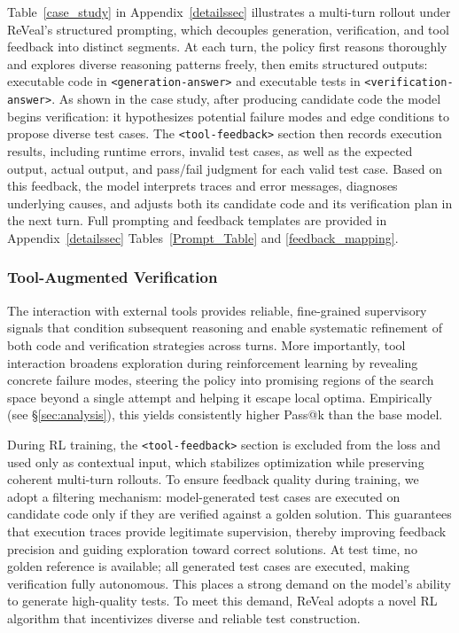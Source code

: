 \documentclass{article} %
\begin{document}
Table~\ref{case_study} in Appendix~\ref{detailssec} illustrates a multi-turn rollout under ReVeal’s structured prompting, which decouples generation, verification, and tool feedback into distinct segments. At each turn, the policy first reasons thoroughly and explores diverse reasoning patterns freely, then emits structured outputs: executable code in \texttt{<generation-answer>} and executable tests in \texttt{<verification-answer>}. As shown in the case study, after producing candidate code the model begins verification: it hypothesizes potential failure modes and edge conditions to propose diverse test cases. The \texttt{<tool-feedback>} section then records execution results, including runtime errors, invalid test cases, as well as the expected output, actual output, and pass/fail judgment for each valid test case. Based on this feedback, the model interprets traces and error messages, diagnoses underlying causes, and adjusts both its candidate code and its verification plan in the next turn.
Full prompting and feedback templates are provided in Appendix~\ref{detailssec} Tables~\ref{Prompt_Table} and \ref{feedback_mapping}.

\subsubsection{Tool-Augmented Verification} The interaction with external tools provides reliable, fine-grained supervisory signals that condition subsequent reasoning and enable systematic refinement of both code and verification strategies across turns.
More importantly, tool interaction broadens exploration during reinforcement learning by revealing concrete failure modes, steering the policy into promising regions of the search space beyond a single attempt and helping it escape local optima. Empirically (see §\ref{sec:analysis}), this yields consistently higher Pass@k than the base model.

During RL training, the \texttt{<tool-feedback>} section is excluded from the loss and used only as contextual input, which stabilizes optimization while preserving coherent multi-turn rollouts.
To ensure feedback quality during training, we adopt a filtering mechanism: model-generated test cases are executed on candidate code only if they are verified against a golden solution. This guarantees that execution traces provide legitimate supervision, thereby improving feedback precision and guiding exploration toward correct solutions. At test time, no golden reference is available; all generated test cases are executed, making verification fully autonomous. This places a strong demand on the model’s ability to generate high-quality tests. To meet this demand, ReVeal adopts a novel RL algorithm that incentivizes diverse and reliable test construction.
\end{document}
